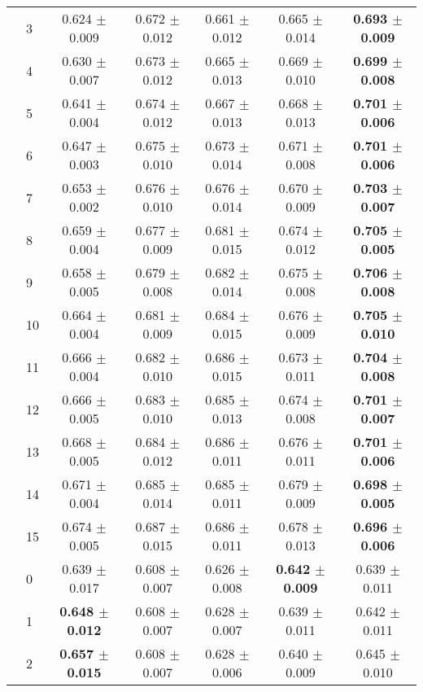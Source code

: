 \begin{table*}[t]
{\begin{tabular}{ll c c c c c}
        & 3 & 0.624 $\pm$ 0.009 & 0.672 $\pm$ 0.012 & 0.661 $\pm$ 0.012 & 0.665 $\pm$ 0.014 & \textbf{0.693 $\pm$ 0.009} \\
        & 4 & 0.630 $\pm$ 0.007 & 0.673 $\pm$ 0.012 & 0.665 $\pm$ 0.013 & 0.669 $\pm$ 0.010 & \textbf{0.699 $\pm$ 0.008} \\
        & 5 & 0.641 $\pm$ 0.004 & 0.674 $\pm$ 0.012 & 0.667 $\pm$ 0.013 & 0.668 $\pm$ 0.013 & \textbf{0.701 $\pm$ 0.006} \\
        & 6 & 0.647 $\pm$ 0.003 & 0.675 $\pm$ 0.010 & 0.673 $\pm$ 0.014 & 0.671 $\pm$ 0.008 & \textbf{0.701 $\pm$ 0.006} \\
        & 7 & 0.653 $\pm$ 0.002 & 0.676 $\pm$ 0.010 & 0.676 $\pm$ 0.014 & 0.670 $\pm$ 0.009 & \textbf{0.703 $\pm$ 0.007} \\
        & 8 & 0.659 $\pm$ 0.004 & 0.677 $\pm$ 0.009 & 0.681 $\pm$ 0.015 & 0.674 $\pm$ 0.012 & \textbf{0.705 $\pm$ 0.005} \\
        & 9 & 0.658 $\pm$ 0.005 & 0.679 $\pm$ 0.008 & 0.682 $\pm$ 0.014 & 0.675 $\pm$ 0.008 & \textbf{0.706 $\pm$ 0.008} \\
        & 10 & 0.664 $\pm$ 0.004 & 0.681 $\pm$ 0.009 & 0.684 $\pm$ 0.015 & 0.676 $\pm$ 0.009 & \textbf{0.705 $\pm$ 0.010} \\
        & 11 & 0.666 $\pm$ 0.004 & 0.682 $\pm$ 0.010 & 0.686 $\pm$ 0.015 & 0.673 $\pm$ 0.011 & \textbf{0.704 $\pm$ 0.008} \\
        & 12 & 0.666 $\pm$ 0.005 & 0.683 $\pm$ 0.010 & 0.685 $\pm$ 0.013 & 0.674 $\pm$ 0.008 & \textbf{0.701 $\pm$ 0.007} \\
        & 13 & 0.668 $\pm$ 0.005 & 0.684 $\pm$ 0.012 & 0.686 $\pm$ 0.011 & 0.676 $\pm$ 0.011 & \textbf{0.701 $\pm$ 0.006} \\
        & 14 & 0.671 $\pm$ 0.004 & 0.685 $\pm$ 0.014 & 0.685 $\pm$ 0.011 & 0.679 $\pm$ 0.009 & \textbf{0.698 $\pm$ 0.005} \\
        & 15 & 0.674 $\pm$ 0.005 & 0.687 $\pm$ 0.015 & 0.686 $\pm$ 0.011 & 0.678 $\pm$ 0.013 & \textbf{0.696 $\pm$ 0.006} \\
\midrule
\assist{} & 0 & 0.639 $\pm$ 0.017 & 0.608 $\pm$ 0.007 & 0.626 $\pm$ 0.008 & \textbf{0.642 $\pm$ 0.009} & 0.639 $\pm$ 0.011 \\
        & 1 & \textbf{0.648 $\pm$ 0.012} & 0.608 $\pm$ 0.007 & 0.628 $\pm$ 0.007 & 0.639 $\pm$ 0.011 & 0.642 $\pm$ 0.011 \\
        & 2 & \textbf{0.657 $\pm$ 0.015} & 0.608 $\pm$ 0.007 & 0.628 $\pm$ 0.006 & 0.640 $\pm$ 0.009 & 0.645 $\pm$ 0.010 \\

\end{tabular}}
\end{table*}
